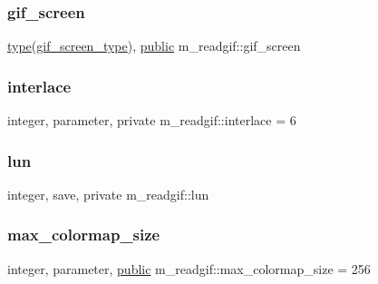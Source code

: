 \mbox{\label{namespacem__readgif_a6253fc469a2750e1d59bc498bca3d6eb}} 
\subsubsection{\texorpdfstring{gif\+\_\+screen}{gif\_screen}}
{\footnotesize\ttfamily \hyperlink{stop__watch_83_8txt_a70f0ead91c32e25323c03265aa302c1c}{type}(\hyperlink{structm__readgif_1_1gif__screen__type}{gif\+\_\+screen\+\_\+type}), \hyperlink{M__stopwatch_83_8txt_a2f74811300c361e53b430611a7d1769f}{public} m\+\_\+readgif\+::gif\+\_\+screen}

\mbox{\label{namespacem__readgif_af71b0131b0327843ab00d56288f1e4a3}} 
\subsubsection{\texorpdfstring{interlace}{interlace}}
{\footnotesize\ttfamily integer, parameter, private m\+\_\+readgif\+::interlace = 6\hspace{0.3cm}{\ttfamily [private]}}

\mbox{\label{namespacem__readgif_ae5e05cba63ef3a16c27f9935d6c2a24d}} 
\subsubsection{\texorpdfstring{lun}{lun}}
{\footnotesize\ttfamily integer, save, private m\+\_\+readgif\+::lun\hspace{0.3cm}{\ttfamily [private]}}

\mbox{\label{namespacem__readgif_a6bce6231298ac3b8c0fe89169eacf790}} 
\subsubsection{\texorpdfstring{max\+\_\+colormap\+\_\+size}{max\_colormap\_size}}
{\footnotesize\ttfamily integer, parameter, \hyperlink{M__stopwatch_83_8txt_a2f74811300c361e53b430611a7d1769f}{public} m\+\_\+readgif\+::max\+\_\+colormap\+\_\+size = 256}

